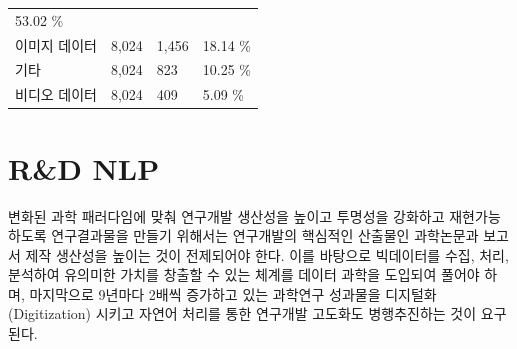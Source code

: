 \documentclass[smallextended]{svjour3}       %
\begin{document}
\begin{longtable}[]{@{}llll@{}}
\begin{minipage}[t]{0.12\columnwidth}
53.02 \%\strut
\end{minipage}\tabularnewline
\begin{minipage}[t]{0.20\columnwidth}\raggedright
이미지 데이터\strut
\end{minipage} & \begin{minipage}[t]{0.14\columnwidth}\raggedright
8,024\strut
\end{minipage} & \begin{minipage}[t]{0.11\columnwidth}\raggedright
1,456\strut
\end{minipage} & \begin{minipage}[t]{0.12\columnwidth}\raggedright
18.14 \%\strut
\end{minipage}\tabularnewline
\begin{minipage}[t]{0.20\columnwidth}\raggedright
기타\strut
\end{minipage} & \begin{minipage}[t]{0.14\columnwidth}\raggedright
8,024\strut
\end{minipage} & \begin{minipage}[t]{0.11\columnwidth}\raggedright
823\strut
\end{minipage} & \begin{minipage}[t]{0.12\columnwidth}\raggedright
10.25 \%\strut
\end{minipage}\tabularnewline
\begin{minipage}[t]{0.20\columnwidth}\raggedright
비디오 데이터\strut
\end{minipage} & \begin{minipage}[t]{0.14\columnwidth}\raggedright
8,024\strut
\end{minipage} & \begin{minipage}[t]{0.11\columnwidth}\raggedright
409\strut
\end{minipage} & \begin{minipage}[t]{0.12\columnwidth}\raggedright
5.09 \%\strut
\end{minipage}\tabularnewline
\bottomrule
\end{longtable}

\hypertarget{rd-nlp}{%
\section{R\&D NLP}\label{rd-nlp}}

변화된 과학 패러다임에 맞춰 연구개발 생산성을 높이고 투명성을 강화하고
재현가능하도록 연구결과물을 만들기 위해서는 연구개발의 핵심적인 산출물인
과학논문과 보고서 제작 생산성을 높이는 것이 전제되어야 한다. 이를
바탕으로 빅데이터를 수집, 처리, 분석하여 유의미한 가치를 창출할 수 있는
체계를 데이터 과학을 도입되여 풀어야 하며, 마지막으로 9년마다 2배씩
증가하고 있는 과학연구 성과물을 디지털화(Digitization) 시키고 자연어
처리를 통한 연구개발 고도화도 병행추진하는 것이 요구된다.
\end{document}
